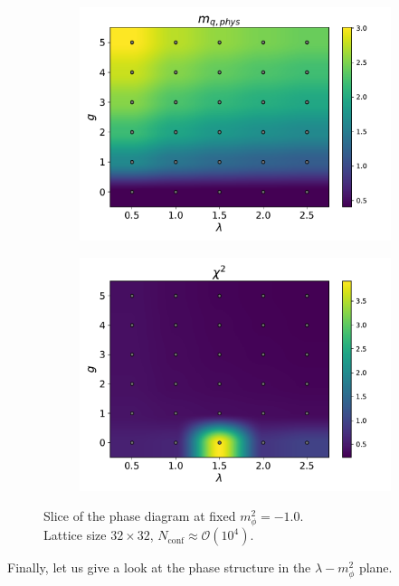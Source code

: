 \begin{figure}[htp]
\begin{subfigure}[b]{0.48\textwidth}
        \includegraphics[width=\textwidth]{figures/phase_diagram/g-lam/phase_diagram_mqphys.pdf}
    \end{subfigure}
    \begin{subfigure}[b]{0.48\textwidth}
        \includegraphics[width=\textwidth]{figures/phase_diagram/g-lam/phase_diagram_chi2.pdf}
    \end{subfigure}
    \caption{Slice of the phase diagram at fixed $m_\phi^2 = -1.0$. \\ Lattice size $32 \times 32$, $N_\text{conf} \approx \mathcal{O}(10^4)$.}
    \label{fig:phase_diagram_g_lam}
\end{figure}
\newpage
Finally, let us give a look at the phase structure in the $\lambda - m_\phi^2$ plane. 
